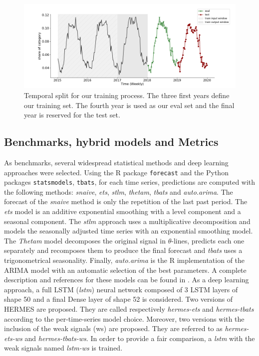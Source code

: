 \documentclass[10pt]{article} %
\begin{document}
\begin{figure}
  \centering
    \includegraphics[width=1.\linewidth]{train_eval_test_set}
  \caption{Temporal split for our training process. The three first years define our training set. The fourth year is used as our eval set and the final year is reserved for the test set.}
\label{fig:train_eval_test_set}
\end{figure}

\subsection{Benchmarks, hybrid models and Metrics}
\label{sec:fashiontraining}

As benchmarks, several widespread statistical methods and deep learning approaches were selected. Using the R package \texttt{forecast} and the Python packages \texttt{statsmodels},  \texttt{tbats}, for each time series, predictions are computed with the following methods: \textit{snaive}, \textit{ets}, \textit{stlm}, \textit{thetam}, \textit{tbats} and \textit{auto.arima}. The forecast of the \textit{snaive} method is only the repetition of the last past period. The \textit{ets} model is an additive exponential smoothing with a level component and a seasonal component. The \textit{stlm} approach uses a multiplicative decomposition and models the seasonally adjusted time series with an exponential smoothing model. The \textit{Thetam} model decomposes the original signal in $\theta$-lines, predicts each one separately and recomposes them to produce the final forecast and \textit{tbats} uses a trigonometrical seasonality. Finally, \textit{auto.arima} is the R implementation of the ARIMA model with an automatic selection of the best parameters. A complete description and references for these models can be found in \citet{hyndman2020}. As a deep learning approach, a full LSTM (\textit{lstm}) neural network composed of 3 LSTM layers of shape 50 and a final Dense layer of shape 52 is considered.
Two versions of HERMES are proposed. They are called respectively \textit{hermes-ets} and \textit{hermes-tbats} according to the per-time-series model choice. Moreover, two versions with the inclusion of the weak signals (ws) are proposed. They are referred to as \textit{hermes-ets-ws} and \textit{hermes-tbats-ws}. In order to provide a fair comparison, a \textit{lstm} with the weak signals named \textit{lstm-ws} is trained.
\end{document}
